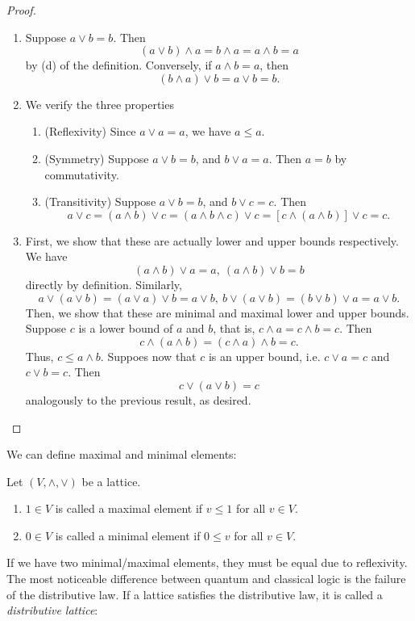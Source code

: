 \documentclass[twoside,symmetric, openany, 12pt]{./tuftebook}
\theoremstyle{definition}
\theoremstyle{definition}
\theoremstyle{definition}
\newenvironment{parts}{\begin{enumerate}[label=(\alph*)]}{\end{enumerate}}
\begin{document}
\begin{proof}
\begin{parts}
\item Suppose $a\vee b = b$. Then
	\[
	(a\vee b)\wedge a = b \wedge a = a \wedge b = a
	\]
	by (d) of the definition. Conversely, if $a\wedge b = a$, then
	\[
	(b\wedge a)\vee b = a \vee b = b 
	.\] 
\item We verify the three properties
	\begin{enumerate}[label=(\arabic*)]
		\item (Reflexivity) Since $a\vee a = a$, we have $a\le a$.
		\item (Symmetry) Suppose $a\vee b = b$, and $b\vee a = a$. Then $a=b$ by commutativity.
		\item (Transitivity) Suppose $a\vee b = b$, and $b \vee c = c$. Then
			\[
			a\vee c= (a \wedge b) \vee c =(a \wedge  b \wedge c) \vee c = [c\wedge (a \wedge b)] \vee c = c
			.\] 
	\end{enumerate}
\item First, we show that these are actually lower and upper bounds respectively. We have
	\[
	(a\wedge b)\vee a = a,~(a\wedge b)\vee b = b
	\] 
	directly by definition. Similarly,
	\[
	a\vee (a\vee b)=(a\vee a)\vee b = a\vee b,~b \vee(a\vee b) = (b\vee b)\vee a = a \vee b
	.\] 
	Then, we show that these are minimal and maximal lower and upper bounds. Suppose $c$ is a lower bound of $a$ and $b$, that is, $c\wedge a = c\wedge b = c$. Then
	\[
	c\wedge (a \wedge b)=(c\wedge a)\wedge b = c
	.\] 
	Thus, $c\le a\wedge b$. Suppoes now that $c$ is an upper bound, i.e. $c\vee a = c$ and $c\vee b = c$. Then
	\[
	c\vee (a\vee b) = c
\]
analogously to the previous result, as desired.\qedhere
\end{parts}	
\end{proof}
We can define maximal and minimal elements:
\begin{Definition}
	Let $(V, \wedge, \vee)$ be a lattice.
	\begin{parts}
	\item $1\in V$ is called a maximal element if $v\le 1$ for all $v\in V$.
	\item $0\in V$ is called a minimal element if $0\le v$ for all $v\in V$.
	\end{parts}
\end{Definition}
If we have two minimal/maximal elements, they must be equal due to reflexivity. The most noticeable difference between quantum and classical logic is the failure of the distributive law. If a lattice satisfies the distributive law, it is called a \emph{distributive lattice}:
\end{document}

